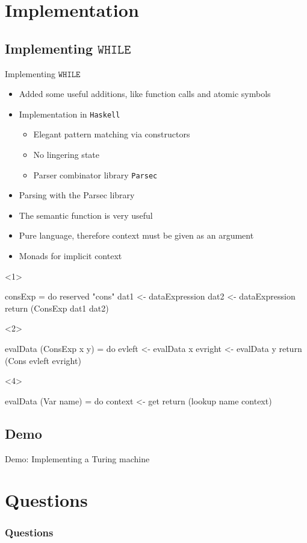 \documentclass{beamer}
\newcommand*{\WHILE}{\ensuremath{\mathtt{WHILE}}\xspace}
\theoremstyle{definition}
\begin{document}
\section{Implementation}
\subsection{Implementing \WHILE}
\begin{frame}{Implementing \WHILE}
	\begin{itemize}[<+->]
		\item Added some useful additions, like function calls and atomic symbols 
		\item Implementation in {\tt Haskell}
			\begin{itemize}
				\item Elegant pattern matching via constructors
				\item No lingering state
				\item Parser combinator library {\tt Parsec} 
			\end{itemize}
	\end{itemize}
\end{frame}

\begin{frame}[t, fragile]
	\begin{itemize}[<+->]
		\item Parsing with the Parsec library
		\item The semantic function is very useful
		\item Pure language, therefore context must be given as an argument
		\item Monads for implicit context
	\end{itemize}
	\begin{onlyenv}
\begin{code}
consExp = do 
  reserved "cons"
  dat1 <- dataExpression
  dat2 <- dataExpression
  return (ConsExp dat1 dat2)
\end{code}
\end{onlyenv}
	\begin{onlyenv}
\begin{code}
evalData (ConsExp x y) = do
  evleft  <- evalData x
  evright <- evalData y
  return (Cons evleft evright)
\end{code}
\end{onlyenv}
	\begin{onlyenv}
\begin{code}
evalData (Var name) = do
  context <- get
  return (lookup name context)
\end{code}
\end{onlyenv}
\end{frame}

\subsection{Demo}
\begin{frame}{Demo: Implementing a Turing machine}
\end{frame}

\section{Questions}
\begin{frame}
	\frametitle{Questions}
\end{frame}
\end{document}
